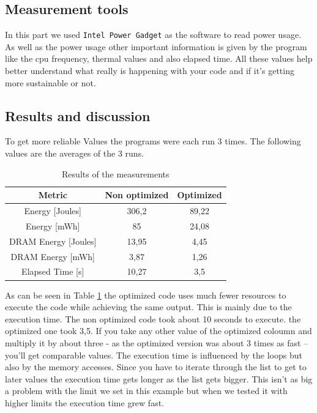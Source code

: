 \documentclass[twocolumn,10pt]{article}
\begin{document}
\subsection{Measurement tools}
In this part we used \texttt{Intel Power Gadget} as the software to read power usage.
As well as the power usage other important information is given by the program like the cpu frequency, thermal values and also elapsed time.
All these values help better understand what really is happening with your code and if it's getting more sustainable or not.

\subsection{Results and discussion}
To get more reliable Values the programs were each run 3 times. The following values are the averages of the 3 runs.

\begin{table}[]
    \centering
    \begin{tabular}{|c|c|c|}
         \hline Metric & Non optimized & Optimized \\ \hline
         Energy [Joules] & 306,2 & 89,22 \\
         Energy [mWh] & 85 & 24,08 \\
         DRAM Energy [Joules] & 13,95 & 4,45 \\
         DRAM Energy [mWh] & 3,87 & 1,26 \\
         Elapsed Time [s] & 10,27 & 3,5 \\ \hline
    \end{tabular}
    \caption{Results of the measurements}
    \label{tab:results}
\end{table}

As can be seen in Table \ref{tab:results} the optimized code uses much fewer resources to execute the code while achieving the same output.
This is mainly due to the execution time. The non optimized code took about 10 seconds to execute. the optimized one took 3,5. If you take any other value of the optimized coloumn and multiply it by about three - as the optimized version was about 3 times as fast -- you'll get comparable values. 
The execution time is influenced by the loops but also by the memory accesses. Since you have to iterate through the list to get to later values the execution time gets longer as the list gets bigger. This isn't as big a problem with the limit we set in this example but when we tested it with higher limits the execution time grew fast.
\end{document}
